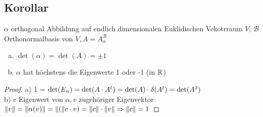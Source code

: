 \subsection{Korollar}
$\alpha$ orthogonal Abbildung auf endlich dimensionalen Euklidischen Vekotrraum $V,\, \mathcal{B}$ Orthonormalbasis von $V, A = A^\mathcal{B}_\alpha$
\begin{enumerate}[a)]
\item $\det(\alpha) = \det(A) = \pm 1$\\
\item $\alpha$ hat höchstens die Eigenwerte 1 oder -1 (in $\mathbb{R}$)
\end{enumerate}
\begin{proof}
a) 1 = $\det(E_n) = \det(A \cdot A^t) = \det(A) \cdot \delta(A^t) = \det(A^2)$\\
b) $c$ Eigenwert von $\alpha, v$ zugehöriger Eigenvektor\\
$\Vert v\Vert = \Vert\alpha(v)\Vert = \Vert(\Vert c \cdot v) = \Vert c\Vert \cdot \Vert v\Vert \Rightarrow \Vert c\Vert = 1$
\end{proof}
